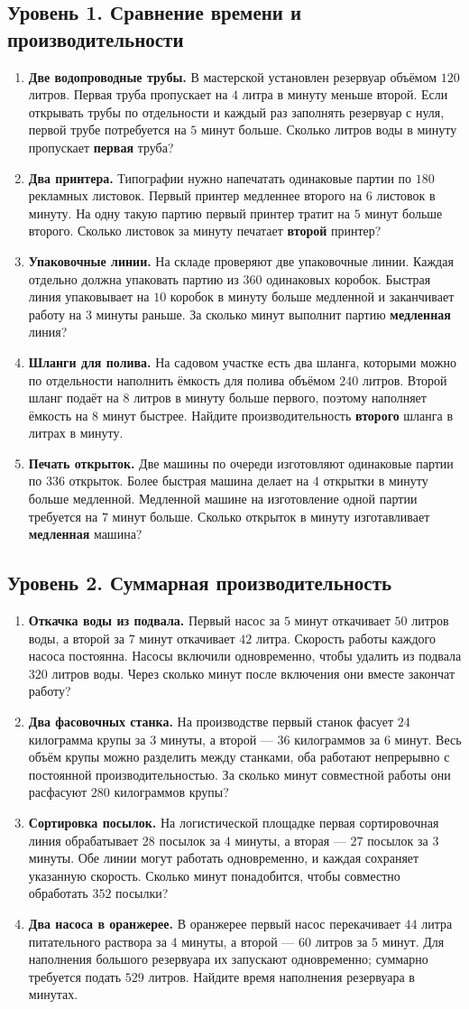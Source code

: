 \documentclass[a4paper,12pt]{article}
\newcommand{\subtopic}[1]{\subsection*{\textcolor{darkaccent}{#1}}}
\newcommand{\task}[2]{\item \textbf{#1.} #2}
\begin{document}
\subtopic{Уровень 1. Сравнение времени и производительности}
\begin{enumerate}[label=\textbf{\arabic*.},leftmargin=9mm,itemsep=11pt]
\task{Две водопроводные трубы}{В мастерской установлен резервуар объёмом $120$ литров. Первая труба пропускает на $4$ литра в минуту меньше второй. Если открывать трубы по отдельности и каждый раз заполнять резервуар с нуля, первой трубе потребуется на $5$ минут больше. Сколько литров воды в минуту пропускает \textbf{первая} труба?}
\task{Два принтера}{Типографии нужно напечатать одинаковые партии по $180$ рекламных листовок. Первый принтер медленнее второго на $6$ листовок в минуту. На одну такую партию первый принтер тратит на $5$ минут больше второго. Сколько листовок за минуту печатает \textbf{второй} принтер?}
\task{Упаковочные линии}{На складе проверяют две упаковочные линии. Каждая отдельно должна упаковать партию из $360$ одинаковых коробок. Быстрая линия упаковывает на $10$ коробок в минуту больше медленной и заканчивает работу на $3$ минуты раньше. За сколько минут выполнит партию \textbf{медленная} линия?}
\task{Шланги для полива}{На садовом участке есть два шланга, которыми можно по отдельности наполнить ёмкость для полива объёмом $240$ литров. Второй шланг подаёт на $8$ литров в минуту больше первого, поэтому наполняет ёмкость на $8$ минут быстрее. Найдите производительность \textbf{второго} шланга в литрах в минуту.}
\task{Печать открыток}{Две машины по очереди изготовляют одинаковые партии по $336$ открыток. Более быстрая машина делает на $4$ открытки в минуту больше медленной. Медленной машине на изготовление одной партии требуется на $7$ минут больше. Сколько открыток в минуту изготавливает \textbf{медленная} машина?}
\end{enumerate}

\clearpage
\subtopic{Уровень 2. Суммарная производительность}
\begin{enumerate}[label=\textbf{\arabic*.},start=6,leftmargin=9mm,itemsep=13pt]
\task{Откачка воды из подвала}{Первый насос за $5$ минут откачивает $50$ литров воды, а второй за $7$ минут откачивает $42$ литра. Скорость работы каждого насоса постоянна. Насосы включили одновременно, чтобы удалить из подвала $320$ литров воды. Через сколько минут после включения они вместе закончат работу?}
\task{Два фасовочных станка}{На производстве первый станок фасует $24$ килограмма крупы за $3$ минуты, а второй --- $36$ килограммов за $6$ минут. Весь объём крупы можно разделить между станками, оба работают непрерывно с постоянной производительностью. За сколько минут совместной работы они расфасуют $280$ килограммов крупы?}
\task{Сортировка посылок}{На логистической площадке первая сортировочная линия обрабатывает $28$ посылок за $4$ минуты, а вторая --- $27$ посылок за $3$ минуты. Обе линии могут работать одновременно, и каждая сохраняет указанную скорость. Сколько минут понадобится, чтобы совместно обработать $352$ посылки?}
\task{Два насоса в оранжерее}{В оранжерее первый насос перекачивает $44$ литра питательного раствора за $4$ минуты, а второй --- $60$ литров за $5$ минут. Для наполнения большого резервуара их запускают одновременно; суммарно требуется подать $529$ литров. Найдите время наполнения резервуара в минутах.}
\end{enumerate}
\end{document}
